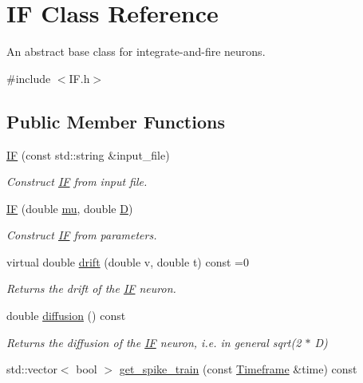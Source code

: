 \hypertarget{classIF}{}\section{IF Class Reference}
\label{classIF}


An abstract base class for integrate-\/and-\/fire neurons.  




{\ttfamily \#include $<$I\+F.\+h$>$}

\subsection*{Public Member Functions}
\begin{DoxyCompactItemize}
\item 
\hyperlink{classIF_a2db11718c548d0c8afabdd1dc96c3b7e}{IF} (const std\+::string \&input\+\_\+file)
\begin{DoxyCompactList}\small\item\em Construct \hyperlink{classIF}{IF} from input file. \end{DoxyCompactList}\item 
\hyperlink{classIF_a965019357edab5848988178828ceaa40}{IF} (double \hyperlink{classIF_a9f690c993d7b7cd0095e26607503db72}{mu}, double \hyperlink{classIF_a7e0fdbf32975dba0acf8096524885639}{D})
\begin{DoxyCompactList}\small\item\em Construct \hyperlink{classIF}{IF} from parameters. \end{DoxyCompactList}\item 
virtual double \hyperlink{classIF_aa8a7a38f8fa3aa013df026734d02784c}{drift} (double v, double t) const =0
\begin{DoxyCompactList}\small\item\em Returns the drift of the \hyperlink{classIF}{IF} neuron. \end{DoxyCompactList}\item 
double \hyperlink{classIF_a37f5085087483968fe31a69589c3dd66}{diffusion} () const
\begin{DoxyCompactList}\small\item\em Returns the diffusion of the \hyperlink{classIF}{IF} neuron, i.\+e. in general sqrt(2 $\ast$ D) \end{DoxyCompactList}\item 
std\+::vector$<$ bool $>$ \hyperlink{classIF_a35bb1a822891b3c17fd4b35db839c398}{get\+\_\+spike\+\_\+train} (const \hyperlink{classTimeframe}{Timeframe} \&time) const

\end{DoxyCompactItemize}
